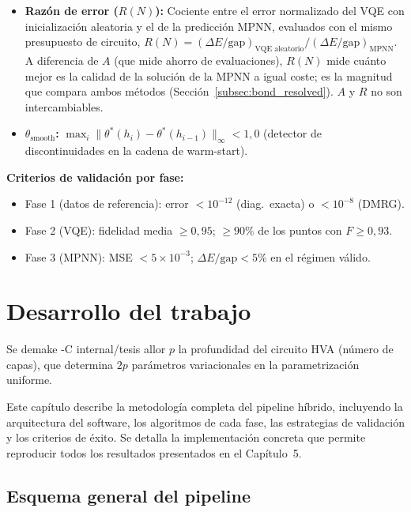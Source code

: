 \documentclass[11pt,a4paper,spanish]{book}
\begin{document}
\begin{itemize}
    \item \textbf{Razón de error ($R(N)$):} Cociente entre el error normalizado del VQE con inicialización aleatoria y el de la predicción MPNN, evaluados con el mismo presupuesto de circuito, $R(N) = (\Delta E/\text{gap})_{\text{VQE aleatorio}} / (\Delta E/\text{gap})_{\text{MPNN}}$. A diferencia de $A$ (que mide ahorro de evaluaciones), $R(N)$ mide cuánto mejor es la calidad de la solución de la MPNN a igual coste; es la magnitud que compara ambos métodos (Sección~\ref{subsec:bond_resolved}). $A$ y $R$ no son intercambiables.
    \item \textbf{$\theta_{\text{smooth}}$:} $\max_i \|\theta^*(h_i) - \theta^*(h_{i-1})\|_\infty < 1,0$ (detector de discontinuidades en la cadena de warm-start).
\end{itemize}

\label{itm:criterios_fase}
\textbf{Criterios de validación por fase:}
\begin{itemize}
    \item Fase 1 (datos de referencia): error $< 10^{-12}$ (diag.\ exacta) o $< 10^{-8}$ (DMRG).
    \item Fase 2 (VQE): fidelidad media $\geq 0,95$; $\geq 90\%$ de los puntos con $F \geq 0,93$.
    \item Fase 3 (MPNN): MSE $< 5 \times 10^{-3}$; $\Delta E/\text{gap} < 5\%$ en el régimen válido.
\end{itemize}



\chapter{Desarrollo del trabajo}

Se demake -C internal/tesis allor $p$ la profundidad del circuito HVA (número de capas), que determina $2p$ parámetros variacionales en la parametrización uniforme.

Este capítulo describe la metodología completa del pipeline híbrido, incluyendo la arquitectura del software, los algoritmos de cada fase, las estrategias de validación y los criterios de éxito. Se detalla la implementación concreta que permite reproducir todos los resultados presentados en el Capítulo~5.

\section{Esquema general del pipeline}
\end{document}
